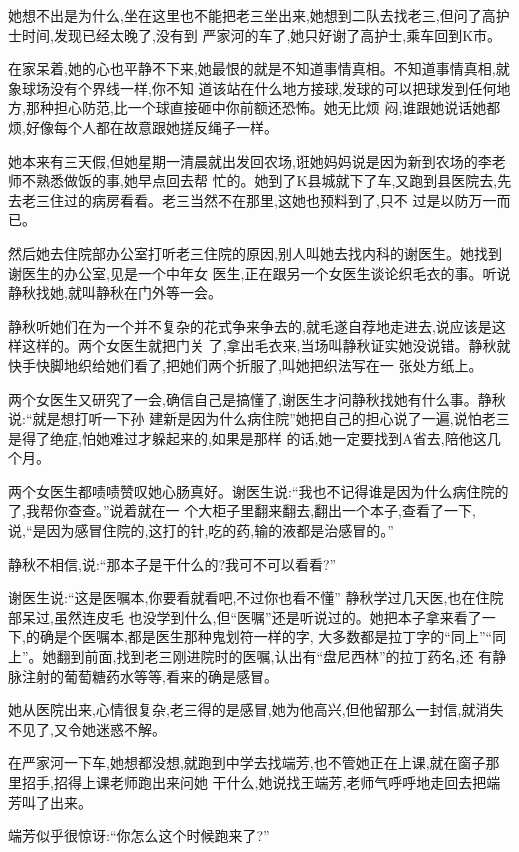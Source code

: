 ﻿\documentclass[12pt]{article}
\begin{document}
她想不出是为什么,坐在这里也不能把老三坐出来,她想到二队去找老三,但问了高护士时间,发现已经太晚了,没有到
严家河的车了,她只好谢了高护士,乘车回到K市。

在家呆着,她的心也平静不下来,她最恨的就是不知道事情真相。不知道事情真相,就象球场没有个界线一样,你不知
道该站在什么地方接球,发球的可以把球发到任何地方,那种担心防范,比一个球直接砸中你前额还恐怖。她无比烦
闷,谁跟她说话她都烦,好像每个人都在故意跟她搓反绳子一样。

她本来有三天假,但她星期一清晨就出发回农场,诳她妈妈说是因为新到农场的李老师不熟悉做饭的事,她早点回去帮
忙的。她到了K县城就下了车,又跑到县医院去,先去老三住过的病房看看。老三当然不在那里,这她也预料到了,只不
过是以防万一而已。

然后她去住院部办公室打听老三住院的原因,别人叫她去找内科的谢医生。她找到谢医生的办公室,见是一个中年女
医生,正在跟另一个女医生谈论织毛衣的事。听说静秋找她,就叫静秋在门外等一会。

静秋听她们在为一个并不复杂的花式争来争去的,就毛遂自荐地走进去,说应该是这样这样的。两个女医生就把门关
了,拿出毛衣来,当场叫静秋证实她没说错。静秋就快手快脚地织给她们看了,把她们两个折服了,叫她把织法写在一
张处方纸上。

两个女医生又研究了一会,确信自己是搞懂了,谢医生才问静秋找她有什么事。静秋说:``就是想打听一下孙\myrule 
建新是因为什么病住院\myrule ''她把自己的担心说了一遍,说怕老三是得了绝症,怕她难过才躲起来的,如果是那样
的话,她一定要找到A省去,陪他这几个月。

两个女医生都啧啧赞叹她心肠真好。谢医生说:``我也不记得谁是因为什么病住院的了,我帮你查查。''说着就在一
个大柜子里翻来翻去,翻出一个本子,查看了一下,说,``是因为感冒住院的,这打的针,吃的药,输的液都是治感冒的。''

静秋不相信,说:``那本子是干什么的?我可不可以看看?''

谢医生说:``这是医嘱本,你要看就看吧,不过你也看不懂\myrule '' 静秋学过几天医,也在住院部呆过,虽然连皮毛
也没学到什么,但``医嘱''还是听说过的。她把本子拿来看了一下,的确是个医嘱本,都是医生那种鬼划符一样的字,
大多数都是拉丁字的``同上''``同上''。她翻到前面,找到老三刚进院时的医嘱,认出有``盘尼西林''的拉丁药名,还
有静脉注射的葡萄糖药水等等,看来的确是感冒。

她从医院出来,心情很复杂,老三得的是感冒,她为他高兴,但他留那么一封信,就消失不见了,又令她迷惑不解。

在严家河一下车,她想都没想,就跑到中学去找端芳,也不管她正在上课,就在窗子那里招手,招得上课老师跑出来问她
干什么,她说找王端芳,老师气呼呼地走回去把端芳叫了出来。

端芳似乎很惊讶:``你怎么\myrule 这个时候跑来了?''
\end{document}
